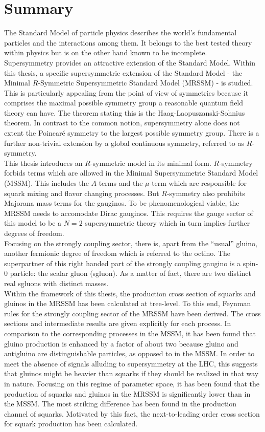 \section{Summary}

The Standard Model of particle physics describes the world's fundamental particles and the interactions among them. It belongs to the best tested theory within physics but is on the other hand known to be incomplete.\\
Supersymmetry provides an attractive extension of the Standard Model. Within this thesis, a specific supersymmetric extension of the Standard Model - the Minimal $R$-Symmetric Supersymmetric Standard Model (MRSSM) - is studied. This is particularly appealing from the point of view of symmetries because it comprises the maximal possible symmetry group a reasonable quantum field theory can have. The theorem stating this is the Haag-Laopuszanski-Sohnius theorem. In contrast to the common notion, supersymmetry alone does not extent the Poincaré symmetry to the largest possible symmetry group. There is a further non-trivial extension by a global continuous symmetry, referred to as $R$-symmetry.\\
This thesis introduces an $R$-symmetric model in its minimal form. $R$-symmetry forbids terms which are allowed in the Minimal Supersymmetric Standard Model (MSSM). This includes the $A$-terms and the $\mu$-term which are responsible for squark mixing and flavor changing processes. But $R$-symmetry also prohibits Majorana mass terms for the gauginos. To be phenomenological viable, the MRSSM needs to accomodate Dirac gauginos. This requires the gauge sector of this model to be a $N=2$ supersymmetric theory which in turn implies further degrees of freedom.\\
Focusing on the strongly coupling sector, there is, apart from the ``usual'' gluino, another fermionic degree of freedom which is referred to the octino. The superpartner of this right handed part of the strongly coupling gaugino is a spin-0 particle: the scalar gluon (sgluon). As a matter of fact, there are two distinct real sgluons with distinct masses.\\ 
Within the framework of this thesis, the production cross section of squarks and gluinos in the MRSSM has been calculated at tree-level. To this end, Feynman rules for the strongly coupling sector of the MRSSM have been derived. The cross sections and intermediate results are given explicitly for each process. In comparison to the corresponding processes in the MSSM, it has been found that gluino production is enhanced by a factor of about two because gluino and antigluino are distinguishable particles, as opposed to in the MSSM. In order to meet the absence of signals alluding to supersymmetry at the LHC, this suggests that gluinos might be heavier than squarks if they should be realized in that way in nature. Focusing on this regime of parameter space, it has been found that the production of squarks and gluinos in the MRSSM is significantly lower than in the MSSM. The most striking difference has been found in the production channel of squarks. Motivated by this fact, the next-to-leading order cross section for squark production has been calculated.\\
